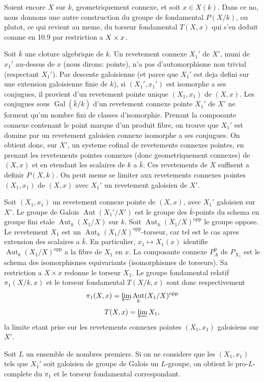\documentclass[12pt,a4paper]{article}
\theoremstyle{plain}
\theoremstyle{definition}
\theoremstyle{remark}
\DeclareMathOperator{\Gal}{Gal}
\DeclareMathOperator{\Aut}{Aut}
\begin{document}
Soient encore $X$ sur $k$, geometriquement connexe, et soit $x \in X(k)$. Dans ce no, nous donnons une autre construction du groupe de fondamental $P(X/k)$, ou plutot, ce qui revient au meme, du torseur fondamental $T(X, x)$ qui s'en deduit comme en 10.9 par restriction a $X \times \\{x\\}$.

Soit $\bar{k}$ une cloture algebrique de $k$. Un revetement connexe $X_1'$ de $X'$, muni de $x_1'$ au-dessus de $x$ (nous dirons: pointe), n'a pas d'automorphisme non trivial (respectant $X_1'$). Par descente galoisienne (et parce que $X_1'$ est deja defini sur une extension galoisienne finie de $k$), si $(X_1', x_1')$ est isomorphe a ses conjugues, il provient d'un revetement pointe unique $(X_1, x_1)$ de $(X, x)$. Les conjugues sous $\Gal(\bar{k}/k)$ d'un revetement connexe pointe $X_1'$ de $X'$ ne forment qu'un nombre fini de classes d'isomorphie. Prenant la composante connexe contenant le point marque d'un produit fibre, on trouve que $X_1'$ est domine par un revetement galoisien connexe isomorphe a ses conjugues. On obtient donc, sur $X'$, un systeme cofinal de revetements connexes pointes, en prenant les revetements pointes connexes (donc geometriquement connexes) de $(X, x)$ et en etendant les scalaires de $k$ a $\bar{k}$. Ces revetements de $X$ suffisent a definir $P(X, k)$. On peut meme se limiter aux revetements connexes pointes $(X_1, x_1)$ de $(X, x)$ avec $X_1'$ un revetement galoisien de $X'$.

Soit $(X_1, x_1)$ un revetement connexe pointe de $(X, x)$, avec $X_1'$ galoisien sur $X'$. Le groupe de Galois $\Aut(X_1'/X')$ est le groupe des $\bar{k}$-points du schema en groupe fini etale $\Aut_k(X_1/X)$ sur $k$. Soit $\Aut_k(X_1/X)^{\mathrm{opp}}$ le groupe oppose. Le revetement $X_1$ est un $\Aut_k(X_1/X)^{\mathrm{opp}}$-torseur, car tel est le cas apres extension des scalaires a $\bar{k}$. En particulier, $x_1 \mapsto X_1(x)$ identifie $\Aut_k(X_1/X)^{\mathrm{opp}}$ a la fibre de $X_1$ en $x$. La composante connexe $P_A^0$ de $P_{X_1}$ est le schema des isomorphismes equivariants (isomorphismes de torseurs). Sa restriction a $X \times x$ redonne le torseur $X_1$. Le groupe fondamental relatif $\pi_1(X/k, x)$ et le torseur fondamental $T(X/k, x)$ sont donc respectivement
$$\pi_1(X, x) = \varprojlim \Aut_k(X_1/X)^{\mathrm{opp}}$$
$$T(X, x) = \varprojlim X_1,$$
la limite etant prise sur les revetements connexes pointes $(X_1, x_1)$ galoisiens sur $X'$.

Soit $L$ un ensemble de nombres premiers. Si on ne considere que les $(X_1, x_1)$ tels que $X_1'$ soit galoisien de groupe de Galois un $L$-groupe, on obtient le pro-$L$-complete du $\pi_1$ et le torseur fondamental correspondant.
\end{document}
